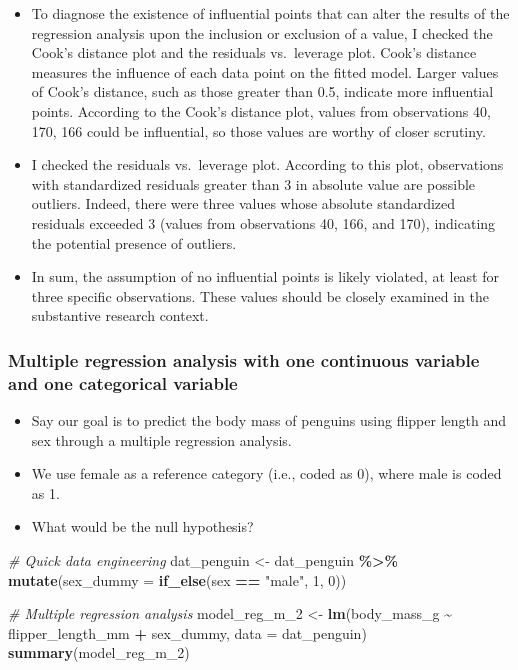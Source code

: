 \documentclass[
]{book}
\newenvironment{Shaded}{\begin{snugshade}}{\end{snugshade}}
\newcommand{\AttributeTok}[1]{\textcolor[rgb]{0.13,0.29,0.53}{#1}}
\newcommand{\CommentTok}[1]{\textcolor[rgb]{0.56,0.35,0.01}{\textit{#1}}}
\newcommand{\DecValTok}[1]{\textcolor[rgb]{0.00,0.00,0.81}{#1}}
\newcommand{\FunctionTok}[1]{\textcolor[rgb]{0.13,0.29,0.53}{\textbf{#1}}}
\newcommand{\NormalTok}[1]{#1}
\newcommand{\OtherTok}[1]{\textcolor[rgb]{0.56,0.35,0.01}{#1}}
\newcommand{\SpecialCharTok}[1]{\textcolor[rgb]{0.81,0.36,0.00}{\textbf{#1}}}
\newcommand{\StringTok}[1]{\textcolor[rgb]{0.31,0.60,0.02}{#1}}
\begin{document}
\begin{itemize}
\item
  To diagnose the existence of influential points that can alter the results of the regression analysis upon the inclusion or exclusion of a value, I checked the Cook's distance plot and the residuals vs.~leverage plot. Cook's distance measures the influence of each data point on the fitted model. Larger values of Cook's distance, such as those greater than 0.5, indicate more influential points. According to the Cook's distance plot, values from observations 40, 170, 166 could be influential, so those values are worthy of closer scrutiny.
\item
  I checked the residuals vs.~leverage plot. According to this plot, observations with standardized residuals greater than 3 in absolute value are possible outliers. Indeed, there were three values whose absolute standardized residuals exceeded 3 (values from observations 40, 166, and 170), indicating the potential presence of outliers.
\item
  In sum, the assumption of no influential points is likely violated, at least for three specific observations. These values should be closely examined in the substantive research context.
\end{itemize}

\subsubsection{Multiple regression analysis with one continuous variable and one categorical variable}\label{multiple-regression-analysis-with-one-continuous-variable-and-one-categorical-variable}

\begin{itemize}
\item
  Say our goal is to predict the body mass of penguins using flipper length and sex through a multiple regression analysis.
\item
  We use female as a reference category (i.e., coded as 0), where male is coded as 1.
\item
  What would be the null hypothesis?
\end{itemize}

\begin{Shaded}
\begin{Highlighting}[]
\CommentTok{\# Quick data engineering}
\NormalTok{dat\_penguin }\OtherTok{\textless{}{-}}\NormalTok{ dat\_penguin }\SpecialCharTok{\%\textgreater{}\%}
  \FunctionTok{mutate}\NormalTok{(}\AttributeTok{sex\_dummy =} \FunctionTok{if\_else}\NormalTok{(sex }\SpecialCharTok{==} \StringTok{"male"}\NormalTok{, }\DecValTok{1}\NormalTok{, }\DecValTok{0}\NormalTok{))}

\CommentTok{\# Multiple regression analysis}
\NormalTok{model\_reg\_m\_2 }\OtherTok{\textless{}{-}} \FunctionTok{lm}\NormalTok{(body\_mass\_g }\SpecialCharTok{\textasciitilde{}}\NormalTok{ flipper\_length\_mm }\SpecialCharTok{+}\NormalTok{ sex\_dummy, }\AttributeTok{data =}\NormalTok{ dat\_penguin)}
\FunctionTok{summary}\NormalTok{(model\_reg\_m\_2)}
\end{Highlighting}
\end{Shaded}
\end{document}
